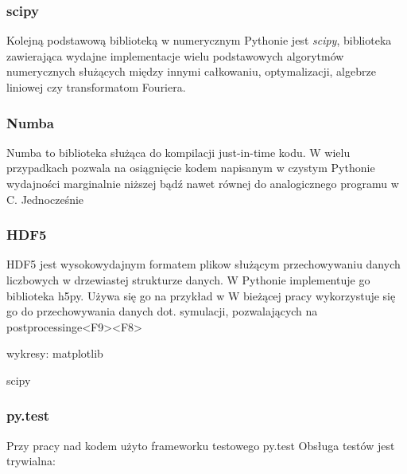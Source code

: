 \subsubsection{scipy}
Kolejną podstawową biblioteką w numerycznym Pythonie jest \emph{scipy}, biblioteka
zawierająca wydajne implementacje wielu podstawowych algorytmów numerycznych służących
między innymi całkowaniu, optymalizacji, algebrze liniowej czy transformatom Fouriera.

\subsubsection{Numba}
Numba to biblioteka służąca do kompilacji just-in-time kodu. %
W wielu przypadkach %
pozwala na osiągnięcie kodem napisanym w czystym Pythonie wydajności marginalnie niższej bądź nawet równej do analogicznego
programu w C. %
Jednocześnie

\subsubsection{HDF5}
HDF5 jest wysokowydajnym formatem plikow służącym przechowywaniu danych liczbowych w drzewiastej strukturze danych.
W Pythonie implementuje go biblioteka h5py.
Używa się go na przykład w %
W bieżącej pracy  wykorzystuje się go do przechowywania danych dot. symulacji, pozwalających na postprocessinge<F9><F8>

    \item wykresy: matplotlib
    \item scipy

\subsubsection{py.test}
Przy pracy nad kodem użyto frameworku testowego py.test %
Obsługa testów jest trywialna:

